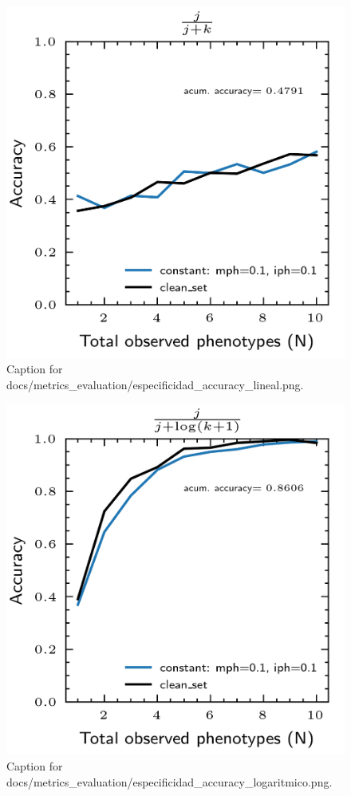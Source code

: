 \documentclass{article}
\begin{document}
\begin{figure}[h] \centering \includegraphics{docs/metrics_evaluation/especificidad_accuracy_lineal.png} \caption{Caption for docs/metrics_evaluation/especificidad_accuracy_lineal.png.} \end{figure}
\begin{figure}[h] \centering \includegraphics{docs/metrics_evaluation/especificidad_accuracy_logaritmico.png} \caption{Caption for docs/metrics_evaluation/especificidad_accuracy_logaritmico.png.} \end{figure}
\end{document}

